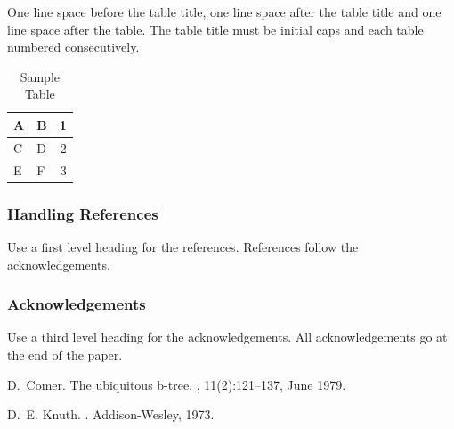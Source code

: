 \documentclass[a4paper]{article}
\begin{document}
One line space before the table title, one line space after the table
title and one line space after the table. The table title must be
initial caps and each table numbered consecutively.

\begin{table}[ht]
\begin{center}
\caption{Sample Table}

\bigskip

\begin{tabular}{|l|l|r|}
\hline
A & B & 1\\ \hline
C & D & 2\\
E & F & 3\\ \hline
\end{tabular}
\end{center}
\end{table}


\subsubsection{Handling References}

Use a first level heading for the references. References follow the
acknowledgements.


\subsubsection{Acknowledgements}

Use a third level heading for the acknowledgements. All acknowledgements
go at the end of the paper.




% 
%

\begin{thebibliography}{Com79}

D.~Comer.
\newblock The ubiquitous b-tree.
, 11(2):121--137, June 1979.

D.~E. Knuth.
.
\newblock Addison-Wesley, 1973.

\end{thebibliography}
\end{document}
